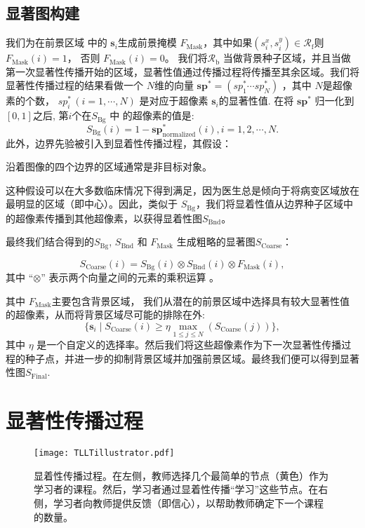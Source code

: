 \subsection{显著图构建}
我们为在前景区域 中的 $\mathbf{s}_i$生成前景掩模 $F_\mathrm{Mask}$，其中如果$(s_i^x,s_i^y) \in \mathcal{R}_\mathrm{f}$则 $F_\mathrm{Mask}{(i)}=1$， 否则 $F_\mathrm{Mask}{(i)}=0$。 我们将$\mathcal{R}_\mathrm{b}$ 当做背景种子区域，并且当做第一次显著性传播开始的区域，显著性值通过传播过程将传播至其余区域。我们将显著性传播过程的结果看做一个 $N$维的向量  $\mathbf{sp}^*=(sp_1^* \cdots sp_N^*)$ ，其中 $N$是超像素的个数， $ sp_i^*\,(i=1, \cdots,N)$ 是对应于超像素 $\mathbf{s}_i$的显著性值. 在将 $\mathbf{sp}^*$ 归一化到 $[0,1]$之后, 第$i$个在$S_\mathrm{Bg}$ 中 的超像素的值是:
\begin{equation}
\label{eq:3}
S_\mathrm{Bg}(i)=1-\mathbf{sp}^*_\mathrm{normalized}(i),i=1,2,\cdots,N.
\end{equation}
此外，边界先验被引入到显着性传播过程，其假设：

沿着图像的四个边界的区域通常是非目标对象。

这种假设可以在大多数临床情况下得到满足，因为医生总是倾向于将病变区域放在最明显的区域（即中心）。因此，类似于 $S_\mathrm{Bg}$，我们将显着性值从边界种子区域中的超像素传播到其他超像素，以获得显着性图$S_\mathrm{Bnd}$。

最终我们结合得到的$S_\mathrm{Bg}$, $S_\mathrm{Bnd}$ 和 $F_\mathrm{Mask}$ 生成粗略的显著图$S_\mathrm{Coarse}$：

\begin{equation}
\label{eq:4}
S_\mathrm{Coarse}(i)=S_\mathrm{Bg}(i) \otimes S_\mathrm{Bnd}(i) \otimes F_\mathrm{Mask}(i),
\end{equation}
其中 ``$\otimes$'' 表示两个向量之间的元素的乘积运算 。

其中 $F_\mathrm{Mask}$主要包含背景区域， 我们从潜在的前景区域中选择具有较大显著性值的超像素，从而将背景区域尽可能的排除在外:
\begin{equation}
\label{eq:5}
\{ \mathbf{s}_i \mid S_\mathrm{Coarse}(i) \geq \eta \max_{1\leq j\leq N}{(S_\mathrm{Coarse}(j))}\},
\end{equation}
其中 $\eta$ 是一个自定义的选择率。然后我们将这些超像素作为下一次显著性传播过程的种子点，并进一步的抑制背景区域并加强前景区域。最终我们便可以得到显著性图$S_\mathrm{Final}$.

\section{显著性传播过程}\label{sec:propagation}
\begin{figure}[htbp]
\begin{center}
\texttt{[image: TLLTillustrator.pdf]}
\end{center}
\caption{显着性传播过程。在左侧，教师选择几个最简单的节点（黄色）作为学习者的课程。然后，学习者通过显着性传播“学习”这些节点。在右侧，学习者向教师提供反馈（即信心），以帮助教师确定下一个课程的数量。}
\label{fig:TLLTillustrator}
\end{figure}

